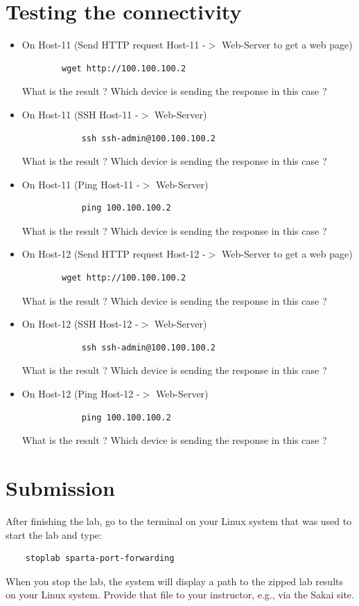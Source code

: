 \section{Testing the connectivity}
\begin{itemize}
	\item On Host-11 (Send HTTP request Host-11 -$>$ Web-Server to get a web page)
	\begin{verbatim}
	    wget http://100.100.100.2
	\end{verbatim}

	What is the result ? Which device is sending the response in this case ?

	\item On Host-11 (SSH Host-11 -$>$ Web-Server)
	\begin{verbatim}
			ssh ssh-admin@100.100.100.2
	\end{verbatim}

	What is the result ? Which device is sending the response in this case ?

	\item On Host-11 (Ping Host-11 -$>$ Web-Server)
	\begin{verbatim}
			ping 100.100.100.2
	\end{verbatim}

	What is the result ? Which device is sending the response in this case ?

	\item On Host-12 (Send HTTP request Host-12 -$>$ Web-Server to get a web page)
	\begin{verbatim}
	    wget http://100.100.100.2
	\end{verbatim}

	What is the result ? Which device is sending the response in this case ?

	\item On Host-12 (SSH Host-12 -$>$ Web-Server)
	\begin{verbatim}
			ssh ssh-admin@100.100.100.2
	\end{verbatim}

	What is the result ? Which device is sending the response in this case ?

	\item On Host-12 (Ping Host-12 -$>$ Web-Server)
	\begin{verbatim}
			ping 100.100.100.2
	\end{verbatim}

	What is the result ? Which device is sending the response in this case ?
\end{itemize}

\section{Submission}
After finishing the lab, go to the terminal on your Linux system that was used to start the lab and type:
\begin{verbatim}
    stoplab sparta-port-forwarding
\end{verbatim}
When you stop the lab, the system will display a path to the zipped lab results on your Linux system.  Provide that file to
your instructor, e.g., via the Sakai site.


